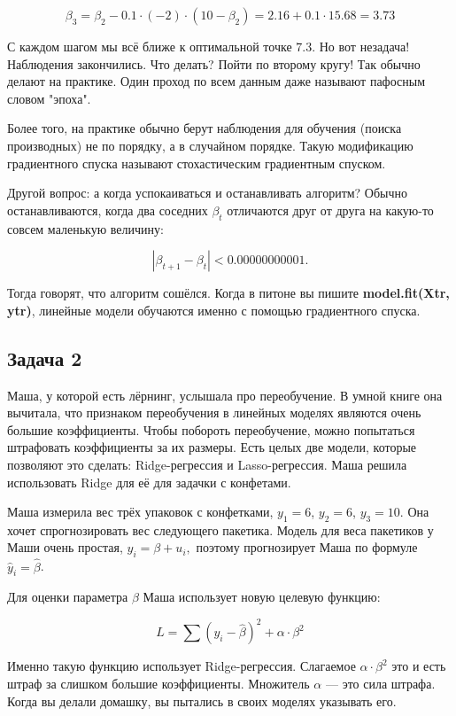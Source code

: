 \documentclass[12pt, a4paper, oneside]{article}
\begin{document}
{\begin{enumerate}
	$$
	\beta_3 = \beta_2 - 0.1 \cdot (-2) \cdot (10 - \beta_2) = 2.16 + 0.1 \cdot 15.68 = 3.73
	$$
	
	С каждом шагом мы всё ближе к оптимальной точке $7.3$.  Но вот незадача! Наблюдения закончились. Что делать?  Пойти по второму кругу! Так обычно делают на практике. Один проход по всем данным даже называют пафосным словом "эпоха". 
	
	Более того, на практике обычно берут наблюдения для обучения (поиска производных) не по порядку, а в случайном порядке. Такую модификацию градиентного спуска называют стохастическим градиентным спуском. 
	
	Другой вопрос: а когда успокаиваться и останавливать алгоритм? Обычно останавливаются, когда два соседних $\beta_t$ отличаются друг от друга на какую-то совсем маленькую величину:
	
	$$
	|\beta_{t+1}  - \beta_t|  < 0.00000000001.
	$$
	
	Тогда говорят, что алгоритм сошёлся. Когда в питоне вы пишите \textbf{model.fit(Xtr, ytr)}, линейные модели обучаются именно с помощью градиентного спуска. 
\end{enumerate}
}


\subsection*{Задача 2}

Маша, у которой есть лёрнинг,  услышала про переобучение. В умной книге она вычитала, что признаком переобучения в линейных моделях являются очень большие коэффициенты. Чтобы побороть переобучение, можно попытаться штрафовать коэффициенты за их размеры. Есть целых две модели, которые позволяют это сделать:  Ridge-регрессия и Lasso-регрессия. Маша решила использовать Ridge для  её для задачки с конфетами.  

Маша измерила вес трёх упаковок с конфетками,  $y_1=6$, $y_2=6$, $y_3=10$.  Она хочет спрогнозировать вес следующего пакетика. Модель для веса пакетиков у Маши очень простая,  $y_i = \beta + u_i, $ поэтому прогнозирует Маша по формуле $\hat y_i = \hat \beta$.

Для оценки параметра $\beta$ Маша использует новую целевую функцию:

\[
L = \sum (y_i - \hat \beta)^2  + \alpha \cdot \beta^2
\]

Именно такую функцию использует Ridge-регрессия. Слагаемое $\alpha \cdot \beta^2$ это и есть штраф за слишком большие коэффициенты.  Множитель $\alpha$ --- это сила штрафа. Когда вы делали домашку, вы пытались в своих моделях указывать его. 
\end{document}
